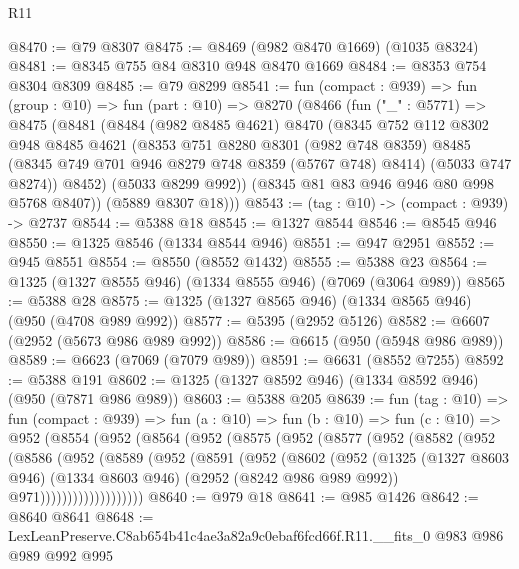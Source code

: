 \begin{lexlean}{R11}
\begin{coremodule}
@8470 := @79 @8307
@8475 := @8469 (@982 @8470 @1669) (@1035 @8324)
@8481 := @8345 @755 @84 @8310 @948 @8470 @1669
@8484 := @8353 @754 @8304 @8309
@8485 := @79 @8299
@8541 := fun (compact : @939) =>
  fun (group : @10) =>
  fun (part : @10) =>
  @8270
    (@8466
      (fun ("_" : @5771) =>
      @8475
        (@8481
          (@8484
            (@982 @8485 @4621)
            @8470
            (@8345
              @752
              @112
              @8302
              @948
              @8485
              @4621
              (@8353
                @751
                @8280
                @8301
                (@982 @748 @8359)
                @8485
                (@8345 @749 @701 @946 @8279 @748 @8359 (@5767 @748) @8414)
                (@5033 @747 @8274))
              @8452)
            (@5033 @8299 @992))
          (@8345 @81 @83 @946 @946 @80 @998 @5768 @8407))
        (@5889 @8307 @18)))
@8543 := (tag : @10) -> (compact : @939) -> @2737
@8544 := @5388 @18
@8545 := @1327 @8544
@8546 := @8545 @946
@8550 := @1325 @8546 (@1334 @8544 @946)
@8551 := @947 @2951
@8552 := @945 @8551
@8554 := @8550 (@8552 @1432)
@8555 := @5388 @23
@8564 := @1325 (@1327 @8555 @946) (@1334 @8555 @946) (@7069 (@3064 @989))
@8565 := @5388 @28
@8575 := @1325 (@1327 @8565 @946) (@1334 @8565 @946) (@950 (@4708 @989 @992))
@8577 := @5395 (@2952 @5126)
@8582 := @6607 (@2952 (@5673 @986 @989 @992))
@8586 := @6615 (@950 (@5948 @986 @989))
@8589 := @6623 (@7069 (@7079 @989))
@8591 := @6631 (@8552 @7255)
@8592 := @5388 @191
@8602 := @1325 (@1327 @8592 @946) (@1334 @8592 @946) (@950 (@7871 @986 @989))
@8603 := @5388 @205
@8639 := fun (tag : @10) =>
  fun (compact : @939) =>
  fun (a : @10) =>
  fun (b : @10) =>
  fun (c : @10) =>
  @952
    (@8554
      (@952
        (@8564
          (@952
            (@8575
              (@952
                (@8577
                  (@952
                    (@8582
                      (@952
                        (@8586
                          (@952
                            (@8589
                              (@952
                                (@8591
                                  (@952
                                    (@8602
                                      (@952
                                        (@1325
                                          (@1327 @8603 @946)
                                          (@1334 @8603 @946)
                                          (@2952 (@8242 @986 @989 @992))
                                          @971)))))))))))))))))))
@8640 := @979 @18
@8641 := @985 @1426
@8642 := @8640 @8641
@8648 := LexLeanPreserve.C8ab654b41c4ae3a82a9c0ebaf6fcd66f.R11.__fits_0 @983 @986 @989 @992 @995

\end{coremodule}
\end{lexlean}
